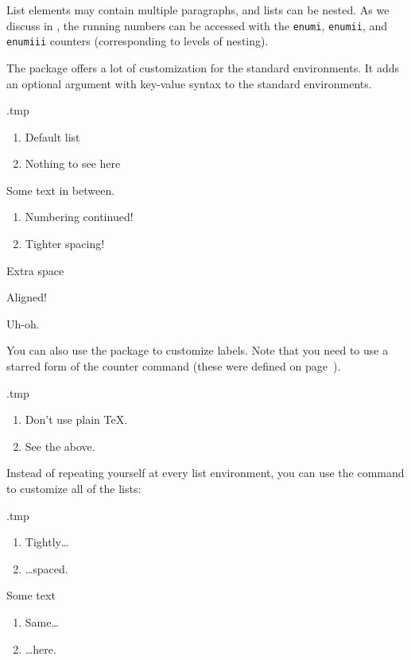 List elements may contain multiple paragraphs,
and lists can be nested.
As we discuss in , the running numbers can be accessed
with the \verb|enumi|, \verb|enumii|, and \verb|enumiii| counters
(corresponding to levels of nesting).

The  package offers a lot of customization for the standard environments.
It adds an optional argument with key-value syntax to the standard environments.
\begin{VerbatimOut}{\jobname.tmp}
\begin{enumerate}
\item Default list
\item Nothing to see here
\end{enumerate}

Some text in between.

\begin{enumerate}
\item Numbering continued!
\item Tighter spacing!
\end{enumerate}

\begin{description}[labelwidth=2cm]
\item[Label] Extra space
\item[Long label] Aligned!
\item[Very long label] Uh-oh.
\end{description}
\end{VerbatimOut}
\ShowExample

You can also use the package to customize labels.
Note that you need to use a starred form of the counter command
(these were defined on page~\pageref{par:counter format}).
\begin{VerbatimOut}{\jobname.tmp}
\begin{enumerate}[noitemsep,
  format=\bfseries,
  label={Rule~\arabic*.}]
\item Don't use plain \TeX.
\item See the above.
\end{enumerate}
\end{VerbatimOut}
\ShowExample

Instead of repeating yourself at every list environment,
you can use the  command to customize all of the lists:
%
\begin{VerbatimOut}{\jobname.tmp}

\begin{enumerate}
\item Tightly\dots
\item \dots{}spaced.
\end{enumerate}

Some text

\begin{enumerate}
\item Same\dots
\item \dots{}here.
\end{enumerate}
\end{VerbatimOut}
\ShowExample

